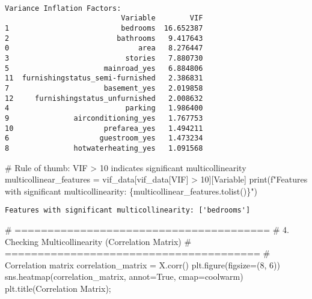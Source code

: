 \documentclass[
  letterpaper,
  DIV=11,
  numbers=noendperiod]{scrreprt}
\newenvironment{Shaded}{\begin{snugshade}}{\end{snugshade}}
\newcommand{\BuiltInTok}[1]{\textcolor[rgb]{0.00,0.23,0.31}{#1}}
\newcommand{\CommentTok}[1]{\textcolor[rgb]{0.37,0.37,0.37}{#1}}
\newcommand{\DecValTok}[1]{\textcolor[rgb]{0.68,0.00,0.00}{#1}}
\newcommand{\NormalTok}[1]{\textcolor[rgb]{0.00,0.23,0.31}{#1}}
\newcommand{\OperatorTok}[1]{\textcolor[rgb]{0.37,0.37,0.37}{#1}}
\newcommand{\SpecialCharTok}[1]{\textcolor[rgb]{0.37,0.37,0.37}{#1}}
\newcommand{\SpecialStringTok}[1]{\textcolor[rgb]{0.13,0.47,0.30}{#1}}
\newcommand{\StringTok}[1]{\textcolor[rgb]{0.13,0.47,0.30}{#1}}
\newcommand{\VariableTok}[1]{\textcolor[rgb]{0.07,0.07,0.07}{#1}}
\begin{document}
\begin{verbatim}

Variance Inflation Factors:
                           Variable        VIF
1                          bedrooms  16.652387
2                         bathrooms   9.417643
0                              area   8.276447
3                           stories   7.880730
5                      mainroad_yes   6.884806
11  furnishingstatus_semi-furnished   2.386831
7                      basement_yes   2.019858
12     furnishingstatus_unfurnished   2.008632
4                           parking   1.986400
9               airconditioning_yes   1.767753
10                     prefarea_yes   1.494211
6                     guestroom_yes   1.473234
8               hotwaterheating_yes   1.091568
\end{verbatim}

\begin{Shaded}
\begin{Highlighting}[]
\CommentTok{\# Rule of thumb: VIF \textgreater{} 10 indicates significant multicollinearity}
\NormalTok{multicollinear\_features }\OperatorTok{=}\NormalTok{ vif\_data[vif\_data[}\StringTok{\textquotesingle{}VIF\textquotesingle{}}\NormalTok{] }\OperatorTok{\textgreater{}} \DecValTok{10}\NormalTok{][}\StringTok{\textquotesingle{}Variable\textquotesingle{}}\NormalTok{]}
\BuiltInTok{print}\NormalTok{(}\SpecialStringTok{f"Features with significant multicollinearity: }\SpecialCharTok{\{}\NormalTok{multicollinear\_features}\SpecialCharTok{.}\NormalTok{tolist()}\SpecialCharTok{\}}\SpecialStringTok{"}\NormalTok{)}
\end{Highlighting}
\end{Shaded}

\begin{verbatim}
Features with significant multicollinearity: ['bedrooms']
\end{verbatim}

\begin{Shaded}
\begin{Highlighting}[]
\CommentTok{\# =======================================}
\CommentTok{\# 4. Checking Multicollinearity (Correlation Matrix)}
\CommentTok{\# =======================================}
\CommentTok{\# Correlation matrix}
\NormalTok{correlation\_matrix }\OperatorTok{=}\NormalTok{ X.corr()}
\NormalTok{plt.figure(figsize}\OperatorTok{=}\NormalTok{(}\DecValTok{8}\NormalTok{, }\DecValTok{6}\NormalTok{))}
\NormalTok{sns.heatmap(correlation\_matrix, annot}\OperatorTok{=}\VariableTok{True}\NormalTok{, cmap}\OperatorTok{=}\StringTok{\textquotesingle{}coolwarm\textquotesingle{}}\NormalTok{)}
\NormalTok{plt.title(}\StringTok{\textquotesingle{}Correlation Matrix\textquotesingle{}}\NormalTok{)}\OperatorTok{;}
\end{Highlighting}
\end{Shaded}
\end{document}
